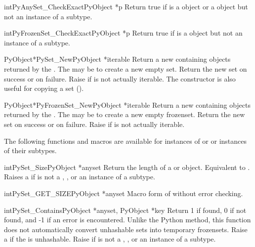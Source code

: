 \begin{cfuncdesc}{int}{PyAnySet_CheckExact}{PyObject *p}
  Return true if  is a  object or a 
  object but not an instance of a subtype.
\end{cfuncdesc}

\begin{cfuncdesc}{int}{PyFrozenSet_CheckExact}{PyObject *p}
  Return true if  is a  object
  but not an instance of a subtype.
\end{cfuncdesc}

\begin{cfuncdesc}{PyObject*}{PySet_New}{PyObject *iterable}
  Return a new  containing objects returned by the
  .  The  may be \NULL{} to create a
  new empty set.  Return the new set on success or \NULL{} on
  failure.  Raise  if  is
  not actually iterable.  The constructor is also useful for
  copying a set ().
\end{cfuncdesc}

\begin{cfuncdesc}{PyObject*}{PyFrozenSet_New}{PyObject *iterable}
  Return a new  containing objects returned by the
  .  The  may be \NULL{} to create a
  new empty frozenset.  Return the new set on success or \NULL{} on
  failure.  Raise  if  is
  not actually iterable.
\end{cfuncdesc}


The following functions and macros are available for instances of
 or  or instances of their subtypes.

\begin{cfuncdesc}{int}{PySet_Size}{PyObject *anyset}
  Return the length of a  or  object.
  Equivalent to .  Raises a
   if  is not a ,
  , or an instance of a subtype.
\end{cfuncdesc}

\begin{cfuncdesc}{int}{PySet_GET_SIZE}{PyObject *anyset}
  Macro form of  without error checking.
\end{cfuncdesc}

\begin{cfuncdesc}{int}{PySet_Contains}{PyObject *anyset, PyObject *key}
  Return 1 if found, 0 if not found, and -1 if an error is
  encountered.  Unlike the Python  method, this
  function does not automatically convert unhashable sets into temporary
  frozensets.  Raise a  if the  is unhashable.
  Raise  if  is not a ,
  , or an instance of a subtype.
\end{cfuncdesc}

